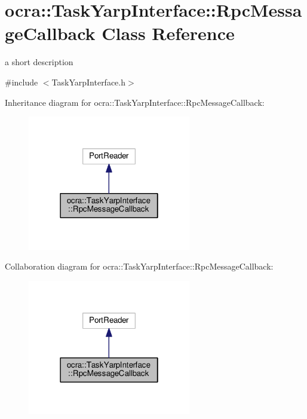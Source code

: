 \hypertarget{classocra_1_1TaskYarpInterface_1_1RpcMessageCallback}{}\section{ocra\+:\+:Task\+Yarp\+Interface\+:\+:Rpc\+Message\+Callback Class Reference}
\label{classocra_1_1TaskYarpInterface_1_1RpcMessageCallback}


a short description  




{\ttfamily \#include $<$Task\+Yarp\+Interface.\+h$>$}



Inheritance diagram for ocra\+:\+:Task\+Yarp\+Interface\+:\+:Rpc\+Message\+Callback\+:
\nopagebreak
\begin{figure}[H]
\begin{center}
\leavevmode
\includegraphics[width=202pt]{df/df4/classocra_1_1TaskYarpInterface_1_1RpcMessageCallback__inherit__graph}
\end{center}
\end{figure}


Collaboration diagram for ocra\+:\+:Task\+Yarp\+Interface\+:\+:Rpc\+Message\+Callback\+:
\nopagebreak
\begin{figure}[H]
\begin{center}
\leavevmode
\includegraphics[width=202pt]{da/d08/classocra_1_1TaskYarpInterface_1_1RpcMessageCallback__coll__graph}
\end{center}
\end{figure}

